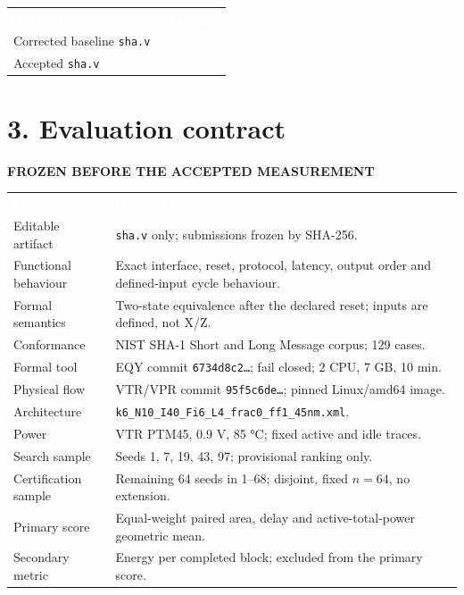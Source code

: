 \documentclass[10pt,a4paper]{article}
\newcommand{\hash}[1]{{\scriptsize\ttfamily\seqsplit{#1}}}
\newcommand{\smallcaps}[1]{\textcolor{Mid}{\fontsize{8.5}{10}\selectfont\bfseries\MakeUppercase{#1}}}
\newcommand{\newpageheading}[2]{\clearpage\section{#1}\smallcaps{#2}\vspace{6pt}}
\newcommand{\thead}[1]{\textcolor{white}{\textbf{#1}}}
\begin{document}
{\small
{}
\begin{tabularx}{\textwidth}{@{}P{52mm}Y@{}}
\thead{Artifact} & \thead{SHA-256} \\
Corrected baseline \texttt{sha.v} & \hash{\BaselineHash} \\
Accepted \texttt{sha.v} & \hash{\AcceptedHash} \\
\end{tabularx}
}

\newpageheading{3. Evaluation contract}{Frozen before the accepted measurement}

{\small
{}
\begin{tabularx}{\textwidth}{@{}B{39mm}Y@{}}
\thead{Dimension} & \thead{Frozen choice} \\
Editable artifact & \texttt{sha.v} only; submissions frozen by SHA-256. \\
Functional behaviour & Exact interface, reset, protocol, latency, output order and defined-input cycle behaviour. \\
Formal semantics & Two-state equivalence after the declared reset; inputs are defined, not X/Z. \\
Conformance & NIST SHA-1 Short and Long Message corpus; 129 cases. \\
Formal tool & EQY commit \texttt{6734d8c2…}; fail closed; 2 CPU, 7 GB, 10 min. \\
Physical flow & VTR/VPR commit \texttt{95f5c6de…}; pinned Linux/amd64 image. \\
Architecture & \texttt{k6\_N10\_I40\_Fi6\_L4\_frac0\_ff1\_45nm.xml}. \\
Power & VTR PTM45, 0.9 V, 85 °C; fixed active and idle traces. \\
Search sample & Seeds 1, 7, 19, 43, 97; provisional ranking only. \\
Certification sample & Remaining 64 seeds in 1--68; disjoint, fixed $n=64$, no extension. \\
Primary score & Equal-weight paired area, delay and active-total-power geometric mean. \\
Secondary metric & Energy per completed block; excluded from the primary score. \\
\end{tabularx}
}
\end{document}
